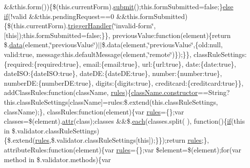 \begin{DoxyCompactItemize}
\&\&this.\+form())\{\$(this.\+current\+Form).\hyperlink{jquery-1_810_82-vsdoc_8js_a58af54f4f7137a051db7e3e27bdfe1b5}{submit}();this.\+form\+Submitted=false;\}\hyperlink{packages_2j_query_8_validation_81_811_81_2_content_2_scripts_2jquery_8validate_8js_a0544c3fe466e421738dae463968b70ba}{else} \hyperlink{packages_2_respond_81_82_80_2content_2_scripts_2respond_8min_8js_a93851d60dd037a83509a1757b9ee7b66}{if}(!valid \&\&this.\+pending\+Request==0 \&\&this.\+form\+Submitted)\{\$(this.\+current\+Form).\hyperlink{jquery-1_810_82-vsdoc_8js_afe18935b86e978c91a4ae291ad8825c8}{trigger\+Handler}(\char`\"{}invalid-\/form\char`\"{}, \mbox{[}this\mbox{]});this.\+form\+Submitted=false;\}\}, previous\+Value\+:function(element)\{return \$.\hyperlink{jquery-1_810_82-vsdoc_8js_a609407b3456fdc3c5671a9fc4a226ff7}{data}(element,\char`\"{}previous\+Value\char`\"{})$\vert$$\vert$\$.data(element,\char`\"{}previous\+Value\char`\"{},\{old\+:null, valid\+:true, message\+:this.\+default\+Message(element,\char`\"{}remote\char`\"{})\});\}\}, class\+Rule\+Settings\+:\{required\+:\{required\+:true\}, email\+:\{email\+:true\}, url\+:\{url\+:true\}, date\+:\{date\+:true\}, date\+I\+S\+O\+:\{date\+I\+S\+O\+:true\}, date\+D\+E\+:\{date\+D\+E\+:true\}, number\+:\{number\+:true\}, number\+D\+E\+:\{number\+D\+E\+:true\}, digits\+:\{digits\+:true\}, creditcard\+:\{creditcard\+:true\}\}, add\+Class\+Rules\+:function(class\+Name, \hyperlink{packages_2_respond_81_82_80_2content_2_scripts_2respond_8js_ada87c2e257bc5ff6e77cdbc23ed986a3}{rules})\{\hyperlink{jquery-1_810_82-vsdoc_8js_ac8c7ab4467fc25f40e85c72221a1f10b}{class\+Name.\+constructor}==String?this.\+class\+Rule\+Settings\mbox{[}class\+Name\mbox{]}=rules\+:\$.\+extend(this.\+class\+Rule\+Settings, class\+Name);\}, class\+Rules\+:function(element)\{var \hyperlink{packages_2_respond_81_82_80_2content_2_scripts_2respond_8js_ada87c2e257bc5ff6e77cdbc23ed986a3}{rules}=\{\};var classes=\$(element).\hyperlink{jquery-1_810_82-vsdoc_8js_aa76c97588b348e5c1975810431456d90}{attr}(\textquotesingle{}class\textquotesingle{});classes \&\&\$.\hyperlink{packages_2j_query_81_810_82_2_content_2_scripts_2jquery-1_810_82_8min_8js_af24c9ea1e34372f8c8b312b35586008d}{each}(classes.\+split(\textquotesingle{} \textquotesingle{}), function()\{\hyperlink{packages_2_respond_81_82_80_2content_2_scripts_2respond_8min_8js_a93851d60dd037a83509a1757b9ee7b66}{if}(this in \$.validator.\+class\+Rule\+Settings)\{\$.extend(\hyperlink{packages_2_respond_81_82_80_2content_2_scripts_2respond_8js_ada87c2e257bc5ff6e77cdbc23ed986a3}{rules},\$.validator.\+class\+Rule\+Settings\mbox{[}this\mbox{]});\}\});return \hyperlink{packages_2_respond_81_82_80_2content_2_scripts_2respond_8js_ada87c2e257bc5ff6e77cdbc23ed986a3}{rules};\}, attribute\+Rules\+:function(element)\{var \hyperlink{packages_2_respond_81_82_80_2content_2_scripts_2respond_8js_ada87c2e257bc5ff6e77cdbc23ed986a3}{rules}=\{\};var \$element=\$(element);for(var method in \$.validator.\+methods)\{var 
\end{DoxyCompactItemize}
